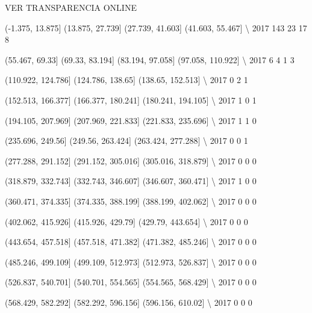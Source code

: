 \documentclass[11pt]{article}
\begin{document}
VER TRANSPARENCIA ONLINE

      (-1.375, 13.875]  (13.875, 27.739]  (27.739, 41.603]  (41.603, 55.467]  \textbackslash{}
2017               143                23                17                 8   

      (55.467, 69.33]  (69.33, 83.194]  (83.194, 97.058]  (97.058, 110.922]  \textbackslash{}
2017                6                4                 1                  3   

      (110.922, 124.786]  (124.786, 138.65]  (138.65, 152.513]  \textbackslash{}
2017                   0                  2                  1   

      (152.513, 166.377]  (166.377, 180.241]  (180.241, 194.105]  \textbackslash{}
2017                   1                   0                   1   

      (194.105, 207.969]  (207.969, 221.833]  (221.833, 235.696]  \textbackslash{}
2017                   1                   1                   0   

      (235.696, 249.56]  (249.56, 263.424]  (263.424, 277.288]  \textbackslash{}
2017                  0                  0                   1   

      (277.288, 291.152]  (291.152, 305.016]  (305.016, 318.879]  \textbackslash{}
2017                   0                   0                   0   

      (318.879, 332.743]  (332.743, 346.607]  (346.607, 360.471]  \textbackslash{}
2017                   1                   0                   0   

      (360.471, 374.335]  (374.335, 388.199]  (388.199, 402.062]  \textbackslash{}
2017                   0                   0                   0   

      (402.062, 415.926]  (415.926, 429.79]  (429.79, 443.654]  \textbackslash{}
2017                   0                  0                  0   

      (443.654, 457.518]  (457.518, 471.382]  (471.382, 485.246]  \textbackslash{}
2017                   0                   0                   0   

      (485.246, 499.109]  (499.109, 512.973]  (512.973, 526.837]  \textbackslash{}
2017                   0                   0                   0   

      (526.837, 540.701]  (540.701, 554.565]  (554.565, 568.429]  \textbackslash{}
2017                   0                   0                   0   

      (568.429, 582.292]  (582.292, 596.156]  (596.156, 610.02]  \textbackslash{}
2017                   0                   0                  0   
\end{document}
